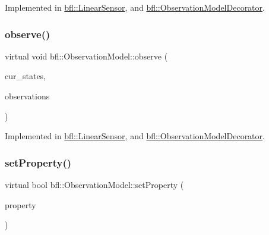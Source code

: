 Implemented in \mbox{\hyperlink{classbfl_1_1LinearSensor_a36f36ae6b935a8c535b553ff6a265f6a}{bfl\+::\+Linear\+Sensor}}, and \mbox{\hyperlink{classbfl_1_1ObservationModelDecorator_a6b0da9bcfe0fd1beb119c79f83f8cc9a}{bfl\+::\+Observation\+Model\+Decorator}}.

\mbox{\label{classbfl_1_1ObservationModel_a2dd06fa6df453e491e1ab73e46f33d18}} 
\subsubsection{\texorpdfstring{observe()}{observe()}}
{\footnotesize\ttfamily virtual void bfl\+::\+Observation\+Model\+::observe (\begin{DoxyParamCaption}\item[{const Eigen\+::\+Ref$<$ const Eigen\+::\+Matrix\+Xf $>$ \&}]{cur\+\_\+states,  }\item[{Eigen\+::\+Ref$<$ Eigen\+::\+Matrix\+Xf $>$}]{observations }\end{DoxyParamCaption})\hspace{0.3cm}{\ttfamily [pure virtual]}}



Implemented in \mbox{\hyperlink{classbfl_1_1LinearSensor_ae53acb6051164c0bcd32d5a6f88e5962}{bfl\+::\+Linear\+Sensor}}, and \mbox{\hyperlink{classbfl_1_1ObservationModelDecorator_aa2b83722ba591ab268def7a39e4e16b0}{bfl\+::\+Observation\+Model\+Decorator}}.

\mbox{\label{classbfl_1_1ObservationModel_a05991496674f63b6ea6c8a34da34194d}} 
\subsubsection{\texorpdfstring{set\+Property()}{setProperty()}}
{\footnotesize\ttfamily virtual bool bfl\+::\+Observation\+Model\+::set\+Property (\begin{DoxyParamCaption}\item[{const std\+::string}]{property }\end{DoxyParamCaption})\hspace{0.3cm}{\ttfamily [pure virtual]}}



